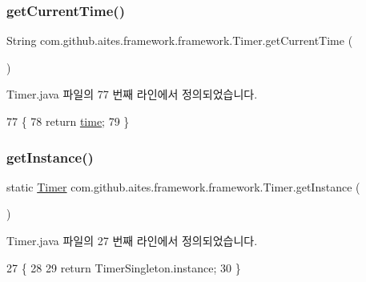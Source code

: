 \subsubsection{\texorpdfstring{get\+Current\+Time()}{getCurrentTime()}}
{\footnotesize\ttfamily String com.\+github.\+aites.\+framework.\+framework.\+Timer.\+get\+Current\+Time (\begin{DoxyParamCaption}{ }\end{DoxyParamCaption})}



Timer.\+java 파일의 77 번째 라인에서 정의되었습니다.


\begin{DoxyCode}
77                                   \{
78         \textcolor{keywordflow}{return} \mbox{\hyperlink{classcom_1_1github_1_1aites_1_1framework_1_1framework_1_1_timer_a04901e0f7fd1f7024218cba52d7a8b26}{time}};
79     \}
\end{DoxyCode}
\mbox{\label{classcom_1_1github_1_1aites_1_1framework_1_1framework_1_1_timer_af355c137bbc1cd2804b908946493d986}} 
\subsubsection{\texorpdfstring{get\+Instance()}{getInstance()}}
{\footnotesize\ttfamily static \mbox{\hyperlink{classcom_1_1github_1_1aites_1_1framework_1_1framework_1_1_timer}{Timer}} com.\+github.\+aites.\+framework.\+framework.\+Timer.\+get\+Instance (\begin{DoxyParamCaption}{ }\end{DoxyParamCaption})\hspace{0.3cm}{\ttfamily [static]}}



Timer.\+java 파일의 27 번째 라인에서 정의되었습니다.


\begin{DoxyCode}
27                                      \{
28 
29         \textcolor{keywordflow}{return} TimerSingleton.instance;
30     \}
\end{DoxyCode}
\mbox{\label{classcom_1_1github_1_1aites_1_1framework_1_1framework_1_1_timer_ad427101e1107bbea67e63333ea68a8fc}} 
